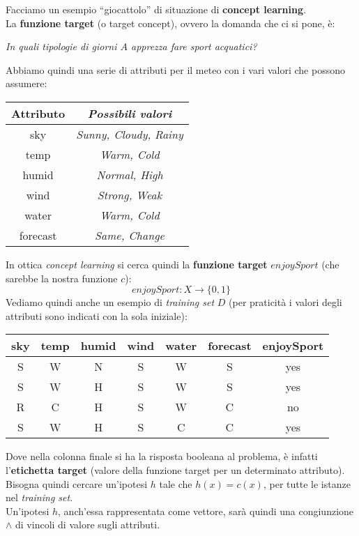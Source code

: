 \begin{esempio}
  Facciamo un esempio ``giocattolo'' di situazione di \textbf{concept
    learning}.\\ 
  La \textbf{funzione target} (o target concept), ovvero la domanda che ci si pone, è:\\
  \begin{center}
    \textit{In quali tipologie di giorni $A$ apprezza fare sport acquatici?}
  \end{center}
  Abbiamo quindi una serie di attributi per il meteo con i vari valori che
  possono assumere:
  \begin{table}[H]
    \centering
    \begin{tabular}[H]{|c|c|}
      \hline
      \textbf{Attributo} & \textbf{\textit{Possibili valori}}\\
      \hline
      sky & \textit{Sunny, Cloudy, Rainy}\\
      temp & \textit{Warm, Cold}\\
      humid & \textit{Normal, High}\\
      wind & \textit{Strong, Weak}\\
      water & \textit{Warm, Cold}\\
      forecast & \textit{Same, Change}\\
      \hline
    \end{tabular}
  \end{table}
  In ottica \textit{concept learning} si cerca quindi la \textbf{funzione
    target} $enjoySport$ (che sarebbe la nostra funzione $c$): 
  \[enjoySport:X\to\{0, 1\}\]
  Vediamo quindi anche un esempio di \textit{training set} $D$ (per praticità i
  valori degli attributi sono indicati con la sola iniziale):
  \begin{table}[H]
    \centering
    \begin{tabular}[H]{|c|c|c|c|c|c|c|}
      \hline
      \textbf{sky} & \textbf{temp} & \textbf{humid} & \textbf{wind} &         
      \textbf{water} & \textbf{forecast} & \textbf{enjoySport}\\
      \hline
      S & W & N & S & W & S & \color{darkgreen} yes\\
      S & W & H & S & W & S & \color{darkgreen} yes\\
      R & C & H & S & W & C & \color{red} no\\
      S & W & H & S & C & C & \color{darkgreen} yes\\
      \hline
    \end{tabular}
  \end{table}
  Dove nella colonna finale si ha la risposta booleana al problema, è infatti
  l'\textbf{etichetta target} (valore della funzione target per un determinato attributo).\\
  Bisogna quindi cercare un'ipotesi $h$ tale che $h(x)=c(x)$,
  per tutte le istanze nel \textit{training set}.\\
  Un'ipotesi $h$, anch'essa rappresentata come vettore, sarà quindi una
  congiunzione $\land$ di vincoli di valore sugli attributi.
  \label{es:tab}
\end{esempio}
